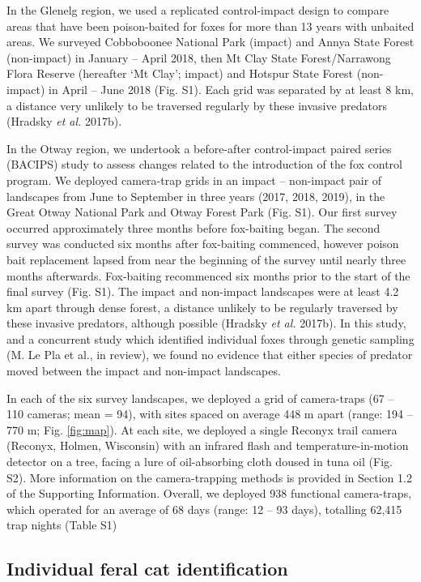 \documentclass[]{elsarticle} %
\begin{document}
In the Glenelg region, we used a replicated control-impact design to compare areas that have been poison-baited for foxes for more than 13 years with unbaited areas. We surveyed Cobboboonee National Park (impact) and Annya State Forest (non-impact) in January -- April 2018, then Mt Clay State Forest/Narrawong Flora Reserve (hereafter `Mt Clay'; impact) and Hotspur State Forest (non-impact) in April -- June 2018 (Fig. S1). Each grid was separated by at least 8 km, a distance very unlikely to be traversed regularly by these invasive predators (Hradsky \emph{et al.} 2017b).

In the Otway region, we undertook a before-after control-impact paired series (BACIPS) study to assess changes related to the introduction of the fox control program. We deployed camera-trap grids in an impact -- non-impact pair of landscapes from June to September in three years (2017, 2018, 2019), in the Great Otway National Park and Otway Forest Park (Fig. S1). Our first survey occurred approximately three months before fox-baiting began. The second survey was conducted six months after fox-baiting commenced, however poison bait replacement lapsed from near the beginning of the survey until nearly three months afterwards. Fox-baiting recommenced six months prior to the start of the final survey (Fig. S1). The impact and non-impact landscapes were at least 4.2 km apart through dense forest, a distance unlikely to be regularly traversed by these invasive predators, although possible (Hradsky \emph{et al.} 2017b). In this study, and a concurrent study which identified individual foxes through genetic sampling (M. Le Pla et al., in review), we found no evidence that either species of predator moved between the impact and non-impact landscapes.

In each of the six survey landscapes, we deployed a grid of camera-traps (67 -- 110 cameras; mean = 94), with sites spaced on average 448 m apart (range: 194 -- 770 m; Fig. \ref{fig:map}). At each site, we deployed a single Reconyx trail camera (Reconyx, Holmen, Wisconsin) with an infrared flash and temperature-in-motion detector on a tree, facing a lure of oil-absorbing cloth doused in tuna oil (Fig. S2). More information on the camera-trapping methods is provided in Section 1.2 of the Supporting Information. Overall, we deployed 938 functional camera-traps, which operated for an average of 68 days (range: 12 -- 93 days), totalling 62,415 trap nights (Table S1)

\hypertarget{individual-feral-cat-identification}{%
\subsection{Individual feral cat identification}\label{individual-feral-cat-identification}}
\end{document}
